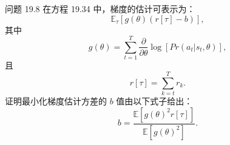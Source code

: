 问题 19.8 在方程 19.34 中，梯度的估计可表示为：
\begin{equation}
\mathbb{E}_\tau \left[ g(\theta)(r[\tau] - b) \right], 
\end{equation}
其中
\begin{equation}
g(\theta) = \sum_{t=1}^{T} \frac{\partial}{\partial \theta} \log[Pr(a_t|s_t, \theta)], 
\end{equation}
且
\begin{equation}
r[\tau] = \sum_{k=t}^{T} r_k. 
\end{equation}
证明最小化梯度估计方差的 \(b\) 值由以下式子给出：
\begin{equation}
b = \frac{\mathbb{E}[g(\theta)^2r[\tau]]}{\mathbb{E}[g(\theta)^2]}. 
\end{equation}































